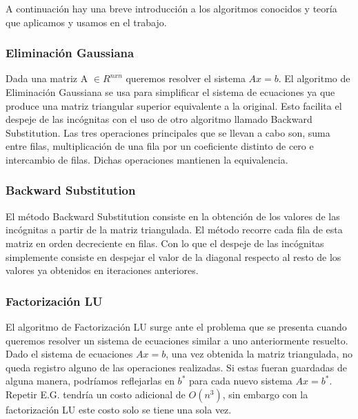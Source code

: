 A continuación hay una breve introducción a los algoritmos conocidos y teoría que aplicamos y usamos en el trabajo.

\subsubsection{Eliminación Gaussiana}
Dada una matriz A $\in R^{nxn}$ queremos resolver el sistema $Ax = b$. El algoritmo de Eliminación Gaussiana se usa para simplificar el sistema de ecuaciones ya que produce una matriz triangular superior equivalente a la original. Esto facilita el despeje de las incógnitas con el uso de otro algoritmo llamado Backward Substitution. Las tres operaciones principales que se llevan a cabo son, suma entre filas, multiplicación de una fila por un coeficiente distinto de cero e intercambio de filas. Dichas operaciones mantienen la equivalencia.

\subsubsection{Backward Substitution}
El método Backward Substitution consiste en la obtención de los valores de las incógnitas a partir de la matriz triangulada. El método recorre cada fila de esta matriz en orden decreciente en filas. Con lo que el despeje de las incógnitas simplemente consiste en despejar el valor de la diagonal respecto al resto de los valores ya obtenidos en iteraciones anteriores.

\subsubsection{Factorización LU}
El algoritmo de Factorización LU surge ante el problema que se presenta cuando queremos resolver un sistema de ecuaciones similar a uno anteriormente resuelto. Dado el sistema de ecuaciones $Ax = b$, una vez obtenida la matriz triangulada, no queda registro alguno de las operaciones realizadas. Si estas fueran guardadas de alguna manera, podríamos reflejarlas en $b^{*}$  para cada nuevo sistema $Ax = b^{*}$. Repetir E.G. tendría un costo adicional de $O(n^{3})$, sin embargo con la factorización LU este costo solo se tiene una sola vez.

